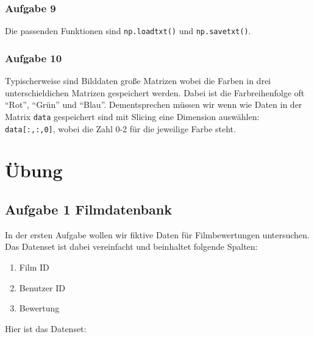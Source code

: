 \documentclass[
  letterpaper,
  DIV=11,
  numbers=noendperiod]{scrreprt}
\providecommand{\tightlist}{%
  \setlength{\itemsep}{0pt}\setlength{\parskip}{0pt}}\usepackage{longtable,booktabs,array}
\begin{document}
\begin{tcolorbox}
\subsection*{Aufgabe 9}\label{aufgabe-9-1}

Die passenden Funktionen sind \texttt{np.loadtxt()} und
\texttt{np.savetxt()}.

\subsection*{Aufgabe 10}\label{aufgabe-10-1}

Typischerweise sind Bilddaten große Matrizen wobei die Farben in drei
unterschieldichen Matrizen gespeichert werden. Dabei ist die
Farbreihenfolge oft ``Rot'', ``Grün'' und ``Blau''. Dementsprechen
müssen wir wenn wie Daten in der Matrix \texttt{data} gespeichert sind
mit Slicing eine Dimension auswählen: \texttt{data{[}:,:,0{]}}, wobei
die Zahl 0-2 für die jeweilige Farbe steht.

\end{tcolorbox}

\chapter{Übung}\label{uxfcbung}

\section{Aufgabe 1 Filmdatenbank}\label{aufgabe-1-filmdatenbank}

In der ersten Aufgabe wollen wir fiktive Daten für Filmbewertungen
untersuchen. Das Datenset ist dabei vereinfacht und beinhaltet folgende
Spalten:

\begin{enumerate}
\def\labelenumi{\arabic{enumi}.}
\tightlist
\item
  Film ID
\item
  Benutzer ID
\item
  Bewertung
\end{enumerate}

Hier ist das Datenset:
\end{document}
